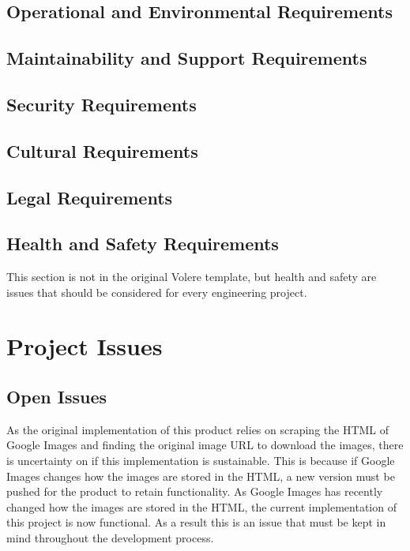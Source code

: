 \documentclass[12pt, titlepage]{article}
\begin{document}
\subsection{Operational and Environmental Requirements}

\subsection{Maintainability and Support Requirements}

\subsection{Security Requirements}

\subsection{Cultural Requirements}

\subsection{Legal Requirements}

\subsection{Health and Safety Requirements}

This section is not in the original Volere template, but health and safety are
issues that should be considered for every engineering project.

\section{Project Issues}

\subsection{Open Issues}

As the original implementation of this product relies on scraping the HTML of Google Images and finding the original image URL to download the images, there is uncertainty on if this implementation is sustainable. This is because if Google Images changes how the images are stored in the HTML, a new version must be pushed for the product to retain functionality. As Google Images has recently changed how the images are stored in the HTML, the current implementation of this project is now functional. As a result this is an issue that must be kept in mind throughout the development process.
\end{document}

